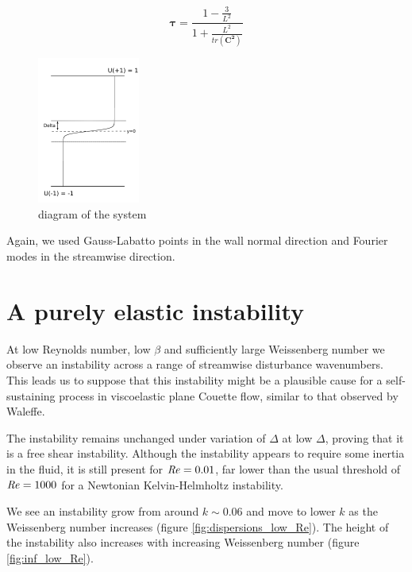 \documentclass{jfm}
\newcommand\Rey{\mbox{\textit{Re}}}  %
\begin{document}
\begin{equation}
    \mathbf{\tau} = \frac{1-\frac{3}{L^{2}}}{1 + \frac{L^{2}}{tr(\mathbf{C^{2}})}}
\end {equation}

\begin{figure}
    \centering
    \includegraphics[width=0.3\textwidth]{KH_diagram}
    \caption{diagram of the system}
    \label{fig:diagram}
\end{figure}

Again, we used Gauss-Labatto points in the wall normal direction and Fourier modes in the streamwise direction.

\section{A purely elastic instability}

At low Reynolds number, low $\beta$ and sufficiently large Weissenberg number we observe an instability across a range of streamwise disturbance wavenumbers. This leads us to suppose that this instability might be a plausible cause for a self-sustaining process in viscoelastic plane Couette flow, similar to that observed by Waleffe.

The instability remains unchanged under variation of $\Delta$ at low $\Delta$, proving that it is a free shear instability. Although the instability appears to require some inertia in the fluid, it is still present for  $\Rey = 0.01$, far lower than the usual threshold of $\Rey = 1000$ for a Newtonian Kelvin-Helmholtz instability.

We see an instability grow from around $k \sim 0.06$ and move to lower $k$ as the Weissenberg number increases (figure \ref{fig:dispersions_low_Re}). The height of the instability also increases with increasing Weissenberg number (figure \ref{fig:inf_low_Re}). 
\end{document}
